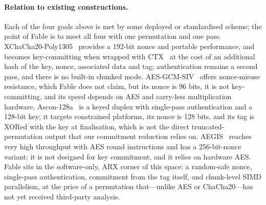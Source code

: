\documentclass{iacrtrans}
\newcommand{\Fable}{\textsf{Fable}\xspace}
\begin{document}
\paragraph{Relation to existing constructions.}
Each of the four goals above is met by some deployed or standardised scheme; the point of \Fable is to meet all four with one permutation and one pass. XChaCha20-Poly1305~\cite{XChaCha} provides a 192-bit nonce and portable performance, and becomes key-committing when wrapped with CTX~\cite{CR22} at the cost of an additional hash of the key, nonce, associated data and tag; authentication remains a second pass, and there is no built-in chunked mode. AES-GCM-SIV~\cite{RFC8452} offers nonce-misuse resistance, which \Fable does not claim, but its nonce is 96 bits, it is not key-committing, and its speed depends on AES and carry-less multiplication hardware. Ascon-128a~\cite{Ascon21} is a keyed duplex with single-pass authentication and a 128-bit key; it targets constrained platforms, its nonce is 128 bits, and its tag is XORed with the key at finalisation, which is not the direct truncated-permutation output that our commitment reduction relies on. AEGIS~\cite{AEGIS13,AEGISdraft} reaches very high throughput with AES round instructions and has a 256-bit-nonce variant; it is not designed for key commitment, and it relies on hardware AES. \Fable sits in the software-only, ARX corner of this space: a random-safe nonce, single-pass authentication, commitment from the tag itself, and chunk-level SIMD parallelism, at the price of a permutation that---unlike AES or ChaCha20---has not yet received third-party analysis.
\end{document}

